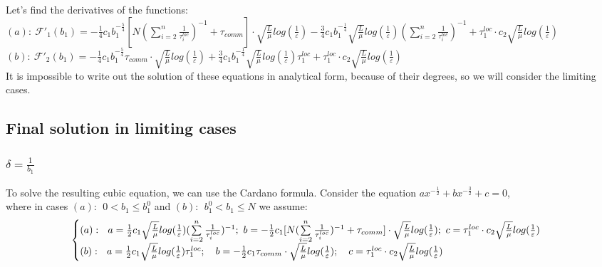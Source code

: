 \documentclass{article}
\begin{document}
Let's find the derivatives of the functions:\\
$(a): ~\mathcal{F'}_1(b_1) = -\frac{1}{4}c_1 b_1^{-\frac{5}{4}}  [N (\sum\limits_{i = 2}^{n} \frac{1}{\tau_i^{loc}})^{-1} + \tau_{comm}]\cdot 
\sqrt{\frac{L}{\mu}}log (\frac{1}{\varepsilon})  - 
\frac{3}{4} c_1 b_1^{-\frac{1}{4}}   \sqrt{\frac{L}{\mu}}log (\frac{1}{\varepsilon})(\sum\limits_{i = 2}^{n} \frac{1}{\tau_i^{loc}})^{-1} +
\tau_1^{loc}\cdot c_2  \sqrt{\frac{L}{\mu}}log (\frac{1}{\varepsilon})$ \\
$(b): ~\mathcal{F'}_2(b_1) = -\frac{1}{4}c_1 b_1^{-\frac{5}{4}} \tau_{comm}\cdot \sqrt{\frac{L}{\mu}}log (\frac{1}{\varepsilon}) + \frac{3}{4} c_1 b_1^{-\frac{1}{4}}  \sqrt{\frac{L}{\mu}}log (\frac{1}{\varepsilon})\tau_1^{loc}   + \tau_1^{loc}\cdot c_2  \sqrt{\frac{L}{\mu}}log (\frac{1}{\varepsilon})$\\

It is impossible to write out the solution of these equations in analytical form, because of their degrees, so we will consider the limiting cases.

\subsection{Final solution in limiting cases}
\subsubsection{$\delta = \frac{1}{b_1}$}\label{eq:3.4.1}
To solve the resulting cubic equation, we can use the Cardano formula.
Consider the equation $ax^{-\frac{1}{2}} + bx^{-\frac{3}{2}} + c = 0$,\\
where in cases $(a): ~ ~ 0 < b_1 \leq b_1^0 $ and $(b): ~ ~ b_1^0 <  b_1 \leq N$ we assume:
\begin{eqnarray}
\notag
    \begin{cases}
    (a): ~ ~ a = \frac{1}{2} c_1 \sqrt{\frac{L}{\mu}}log (\frac{1}{\varepsilon})(\sum\limits_{i = 2}^{n} \frac{1}{\tau_i^{loc}})^{-1}; ~
b = -\frac{1}{2} c_1 [N (\sum\limits_{i = 2}^{n} \frac{1}{\tau_i^{loc}})^{-1} + \tau_{comm}]\cdot 
\sqrt{\frac{L}{\mu}}log (\frac{1}{\varepsilon}); ~ 
c = \tau_1^{loc}\cdot c_2  \sqrt{\frac{L}{\mu}}log (\frac{1} {\varepsilon})
    \\
\notag
    (b): ~ ~ a = \frac{1}{2} c_1  \sqrt{\frac{L}{\mu}}log (\frac{1}{\varepsilon})\tau_1^{loc}; \quad 
b = -\frac{1}{2}c_1 \tau_{comm}\cdot \sqrt{\frac{L}{\mu}}log (\frac{1}{\varepsilon}); \quad 
c = \tau_1^{loc}\cdot c_2  \sqrt{\frac{L}{\mu}}log (\frac{1} {\varepsilon})
    \end{cases}\,
\end{eqnarray}
\end{document}
